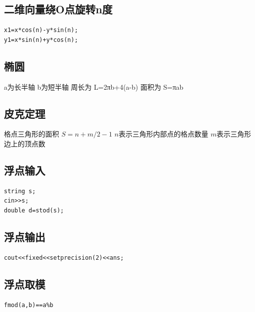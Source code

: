 \documentclass[12pt, a4paper, oneside]{ctexart}
\begin{document}
\newpage 
\subsection{二维向量绕O点旋转n度} 
\begin{lstlisting}
x1=x*cos(n)-y*sin(n);
y1=x*sin(n)+y*cos(n);
\end{lstlisting}

\subsection{椭圆} 
a为长半轴 b为短半轴 周长为 L=2πb+4(a-b) 面积为 S=πab

\subsection{皮克定理} 
格点三角形的面积 ${S=n+m/2-1}$  ${n}$表示三角形内部点的格点数量 ${m}$表示三角形边上的顶点数

\subsection{浮点输入} 
\begin{lstlisting}
string s;
cin>>s;
double d=stod(s);
\end{lstlisting}

\subsection{浮点输出} 
\begin{lstlisting}
cout<<fixed<<setprecision(2)<<ans;
\end{lstlisting}

\subsection{浮点取模} 
\begin{lstlisting}
fmod(a,b)==a%b
\end{lstlisting}

\newpage 
\end{document}
